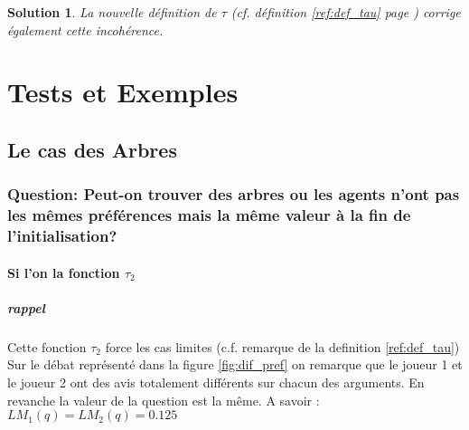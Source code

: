 \documentclass[12pt]{article}
\theoremstyle{defi}
\theoremstyle{not}
\theoremstyle{prob}
\newtheorem{solution}{Solution}[problem]
\begin{document}
    \begin{solution}
      La nouvelle définition de $\tau$ (cf. définition \ref{ref:def_tau} page \pageref{ref:def_tau}) corrige également cette incohérence.
    \end{solution}


  \section{Tests et Exemples}
    \subsection{Le cas des Arbres}
      \subsubsection{Question: Peut-on trouver des arbres ou les agents n'ont pas les mêmes préférences mais la même valeur à la fin de l'initialisation?\newline}

        \paragraph{Si l'on la fonction $\tau_2$}

          \subparagraph{rappel} Cette fonction $\tau_2$ force les cas limites (c.f. remarque de la definition \ref{ref:def_tau}) \\

          Sur le débat représenté dans la figure \ref{fig:dif_pref} on remarque que le joueur 1 et le joueur 2 ont des avis totalement différents sur chacun des arguments. En revanche la valeur de la question est la même. A savoir : $LM_1(q) = LM_2(q) = 0.125$
\end{document}

